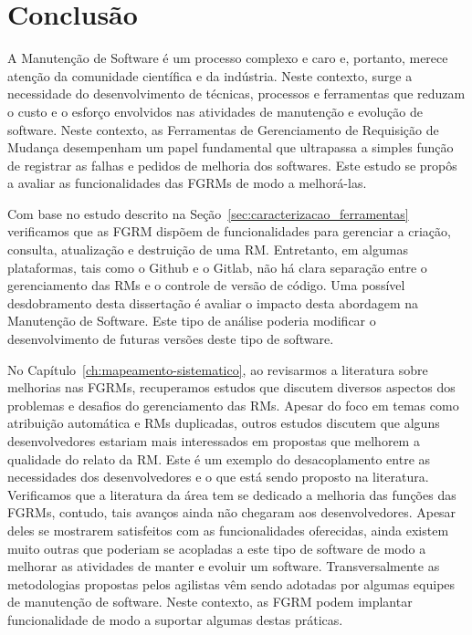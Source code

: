 \chapter{Conclusão}
\label{ch:conclusao_trab_futuros}

A Manutenção de Software é um processo complexo e caro e, portanto, merece
atenção da comunidade científica e da indústria. Neste contexto, surge a
necessidade do desenvolvimento de técnicas, processos e ferramentas que reduzam
o custo e o esforço envolvidos nas atividades de manutenção e evolução de
software. Neste contexto, as Ferramentas de Gerenciamento de Requisição de
Mudança desempenham um papel fundamental que ultrapassa a simples função de
registrar as falhas e pedidos de melhoria dos softwares. Este estudo se propôs a
avaliar as funcionalidades das FGRMs de modo a melhorá-las.

Com base no estudo descrito na Seção~\ref{sec:caracterizacao_ferramentas}
verificamos que as FGRM dispõem de funcionalidades para gerenciar a criação,
consulta, atualização e destruição de uma RM\@. Entretanto, em algumas
plataformas, tais como o Github e o Gitlab, não há clara separação entre o
gerenciamento das RMs e o controle de versão de código. Uma possível
desdobramento desta dissertação é avaliar o impacto desta abordagem na
Manutenção de Software. Este tipo de análise poderia modificar o desenvolvimento
de futuras versões deste tipo de software.

No Capítulo~\ref{ch:mapeamento-sistematico}, ao revisarmos a literatura sobre
melhorias nas FGRMs, recuperamos estudos que discutem diversos aspectos dos
problemas e desafios do gerenciamento das RMs. Apesar do foco em temas como
atribuição automática e RMs duplicadas, outros estudos discutem que alguns
desenvolvedores estariam mais interessados em propostas que melhorem a qualidade
do relato da RM\@. Este é um exemplo do desacoplamento entre as necessidades dos
desenvolvedores e o que está sendo proposto na literatura. Verificamos que a
literatura da área tem se dedicado a melhoria das funções das FGRMs, contudo,
tais avanços ainda não chegaram aos desenvolvedores. Apesar deles se mostrarem
satisfeitos com as funcionalidades oferecidas, ainda existem muito outras que
poderiam se acopladas a este tipo de software de modo a melhorar as atividades
de manter e evoluir um software. Transversalmente as metodologias propostas
pelos agilistas vêm sendo adotadas por algumas equipes de manutenção de
software. Neste contexto, as FGRM podem implantar funcionalidade de modo a
suportar algumas destas práticas.

